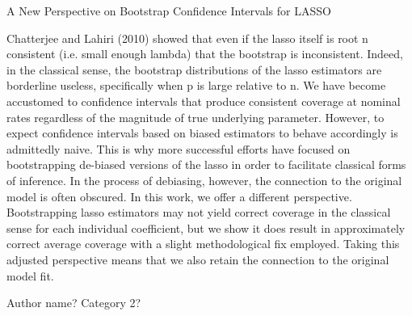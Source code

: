 A New Perspective on Bootstrap Confidence Intervals for LASSO

Chatterjee and Lahiri (2010) showed that even if the lasso itself is root n consistent (i.e. small enough lambda) that the bootstrap is inconsistent. Indeed, in the classical sense, the bootstrap distributions of the lasso estimators are borderline useless, specifically when p is large relative to n. We have become accustomed to confidence intervals that produce consistent coverage at nominal rates regardless of the magnitude of true underlying parameter. However, to expect confidence intervals based on biased estimators to behave accordingly is admittedly naive. This is why more successful efforts have focused on bootstrapping de-biased versions of the lasso in order to facilitate classical forms of inference. In the process of debiasing, however, the connection to the original model is often obscured. In this work, we offer a different perspective. Bootstrapping lasso estimators may not yield correct coverage in the classical sense for each individual coefficient, but we show it does result in approximately correct average coverage with a slight methodological fix employed. Taking this adjusted perspective means that we also retain the connection to the original model fit.

Author name?
Category 2?